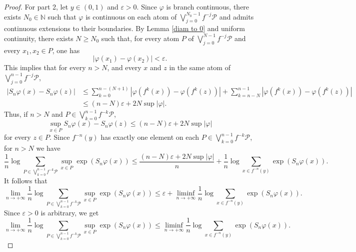 \documentclass[10pt,a4paper]{amsart}
\numberwithin{equation}{section} %
\numberwithin{figure}{section} %
\renewcommand{\=}{\coloneqq}
\begin{document}
\begin{proof}
For part 2, let $y\in(0,1)$ and $\varepsilon>0$. Since $\varphi$ is branch continuous, there exists $N_0 \in \mathbb{N}$ such that $\varphi$ is continuous on each atom of $\bigvee_{j=0}^{N_0-1} f^{-j}\mathcal{P}$ and admits continuous extensions to their boundaries. By Lemma \ref{diam to 0}  and uniform continuity, there exists $N\geq N_0$ such that, for every atom $P$ of $\bigvee_{j=0}^{N-1} f^{-j}\mathcal{P}$ and every $x_1,x_2\in P$, one has
\begin{equation*}
   |\varphi(x_1) - \varphi(x_2)|<\varepsilon. 
\end{equation*}
This implies that for every $n> N$, and every $x$ and $z$ in the same atom of $\bigvee_{j=0}^{n-1} f^{-j}\mathcal{P}$, 
\begin{equation*}
\begin{split}
    |S_n\varphi(x) - S_n\varphi(z)| &\leq \sum_{k=0}^{n-(N+1)} |\varphi(f^k(x)) - \varphi(f^k(z))| + \sum_{k=n-N}^{n-1} |\varphi(f^k(x)) - \varphi(f^k(z))|\\
    &\leq (n-N)\varepsilon + 2N\sup|\varphi|. 
    \end{split}
\end{equation*}
Thus, if $n> N$ and $P \in \bigvee_{k=0}^{n-1} f^{-k}\mathcal{P}$,
\begin{equation*}
    \sup_{x\in P}S_n\varphi(x) - S_n\varphi(z) \leq (n-N)\varepsilon + 2N\sup|\varphi|
\end{equation*}
for every $z\in P$. Since $f^{-n}(y)$ has exactly one element on each $P\in \bigvee_{k=0}^{n-1} f^{-k}\mathcal{P}$, for $n>N$ we have
\begin{equation*}
    \frac{1}{n} \log \sum_{P\in \bigvee_{k=0}^{n-1}f^{-k} \mathcal{P}} \sup_{x\in P}\exp(S_n\varphi(x)) \leq \frac{(n-N)\varepsilon + 2N\sup|\varphi|}{n} + \frac{1}{n} \log \sum_{x\in f^{-n}(y)}\exp(S_n\varphi(x)).
\end{equation*}
It follows that 
\begin{equation*}
    \lim_{n\to+\infty}  \frac{1}{n}\log \sum_{P\in \bigvee_{k=0}^{n-1}f^{-k} \mathcal{P}} \sup_{x\in P}\exp(S_n\varphi(x)) \leq \varepsilon + \liminf_{n\to+\infty} \frac{1}{n} \log \sum_{x\in f^{-n}(y)} \exp(S_n \varphi(x)).
\end{equation*}
Since $\varepsilon>0$ is arbitrary, we get
\begin{equation}\label{equation tree pressure lower bound}
     \lim_{n\to+\infty}  \frac{1}{n}\log \sum_{P\in \bigvee_{k=0}^{n-1}f^{-k} \mathcal{P}} \sup_{x\in P}\exp(S_n\varphi(x)) \leq \liminf_{n\to+\infty} \frac{1}{n} \log \sum_{x\in f^{-n}(y)} \exp(S_n \varphi(x)).

\end{equation}
\end{proof}
\end{document}
